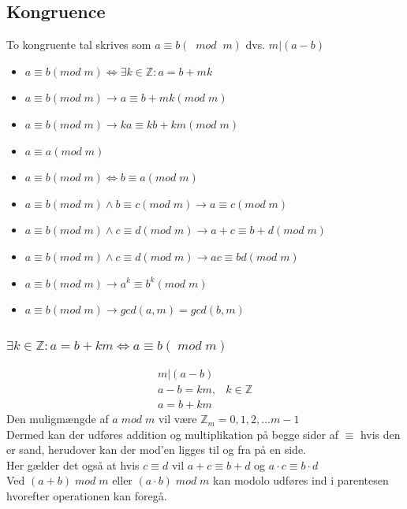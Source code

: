 \documentclass[12pt, a4paper]{article}
\begin{document}
			\subsection{Kongruence}
				To kongruente tal skrives som $a\equiv b (\; \; mod \; \; m)$ dvs. $m|(a-b)$\\
				\begin{itemize}
					\item $a\equiv b (mod \; m)\iff \exists k \in \mathbb{Z}:a=b+mk$
					\item $a\equiv b (mod\; m) \rightarrow a\equiv b+mk (mod\;m)$
					\item $a\equiv b (mod\; m)\rightarrow ka\equiv kb+km(mod\; m)$
					\item $a\equiv a (mod\;m)$
					\item $a\equiv b (mod\;m)\iff b\equiv a (mod\;m)$
					\item $a\equiv b (mod\;m)\land b\equiv c (mod\;m)\rightarrow a\equiv c (mod\;m)$
					\item $a\equiv b (mod\;m)\land c\equiv d (mod\;m)\rightarrow a+c\equiv b+d (mod\;m)$
					\item $a\equiv b (mod\;m)\land c\equiv d (mod\;m)\rightarrow ac\equiv bd (mod\;m)$
					\item $a\equiv b (mod\;m)\rightarrow a^k\equiv b^k (mod\;m)$
					\item $a\equiv b (mod\;m)\rightarrow gcd(a,m)=gcd(b,m)$
				\end{itemize}
				\subsubsection{$\exists k \in \mathbb{Z}: a=b+km \iff a\equiv b (\; mod \; m)$} 
					\begin{align*}
						m|(a-b)\\
						a-b=km, &k\in\mathbb{Z}\\
						a=b+km
					\end{align*}
				Den muligmængde af $a \; mod \; m$ vil være $\mathbb{Z}_m = {0,1,2,... m-1}$\\
				Dermed kan der udføres addition og multiplikation på begge sider af $\equiv$ hvis den er sand, herudover kan der mod'en ligges til og fra på en side.\\
				Her gælder det også at hvis $c\equiv d$ vil $a+c\equiv b+d$ og $a\cdot c \equiv b\cdot d$\\
				Ved $(a+b) \; mod \; m$ eller $(a\cdot b) \; mod \; m$ kan modolo udføres ind i parentesen hvorefter operationen kan foregå.\\
\end{document}
